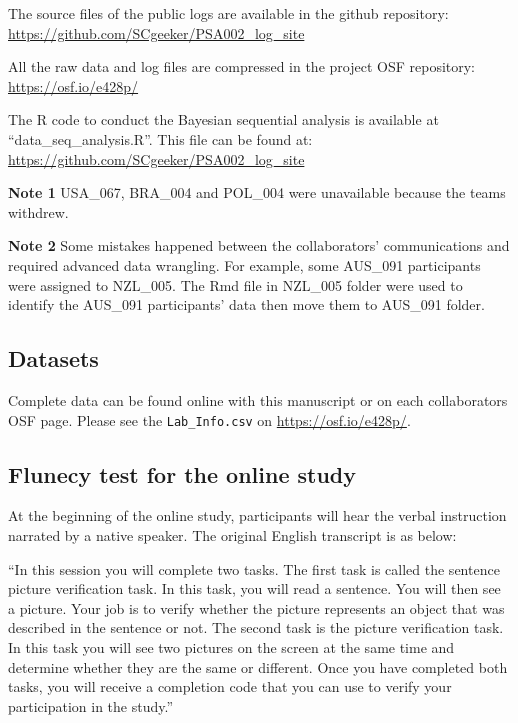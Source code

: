 \documentclass[
  man,floatsintext]{apa7}
\begin{document}
The source files of the public logs are available in the github repository:
\url{https://github.com/SCgeeker/PSA002_log_site}

All the raw data and log files are compressed in the project OSF repository: \url{https://osf.io/e428p/}

The R code to conduct the Bayesian sequential analysis is available at ``data\_seq\_analysis.R''. This file can be found at: \url{https://github.com/SCgeeker/PSA002_log_site}

\textbf{Note 1} USA\_067, BRA\_004 and POL\_004 were unavailable because the teams withdrew.

\textbf{Note 2} Some mistakes happened between the collaborators' communications and required advanced data wrangling. For example, some AUS\_091 participants were assigned to NZL\_005. The Rmd file in NZL\_005 folder were used to identify the AUS\_091 participants' data then move them to AUS\_091 folder.

\hypertarget{datasets}{%
\subsection{Datasets}\label{datasets}}

Complete data can be found online with this manuscript or on each collaborators OSF page. Please see the \texttt{Lab\_Info.csv} on \url{https://osf.io/e428p/}.

\hypertarget{flunecy-test-for-the-online-study}{%
\subsection{Flunecy test for the online study}\label{flunecy-test-for-the-online-study}}

At the beginning of the online study, participants will hear the verbal instruction narrated by a native speaker. The original English transcript is as below:

``In this session you will complete two tasks. The first task is called the sentence picture verification task. In this task, you will read a sentence. You will then see a picture. Your job is to verify whether the picture represents an object that was described in the sentence or not. The second task is the picture verification task. In this task you will see two pictures on the screen at the same time and determine whether they are the same or different. Once you have completed both tasks, you will receive a completion code that you can use to verify your participation in the study.''
\end{document}

